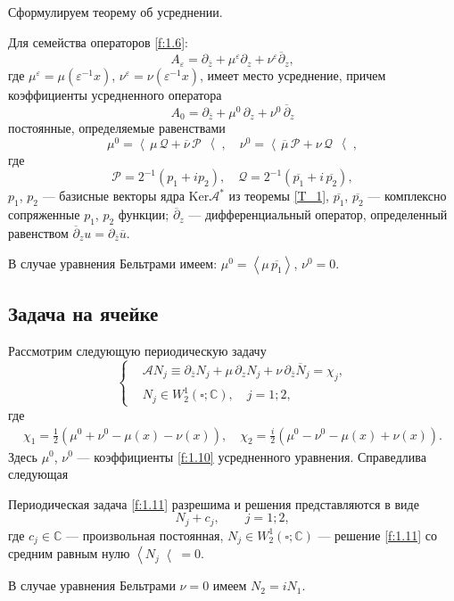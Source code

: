 Сформулируем теорему об усреднении.
\begin{theorem}[(Об усреднении)]\label{T_2}
Для семейства операторов \eqref{f:1.6}:
\begin{equation*}
   A_\varepsilon=\partial_{\bar{z}}+\mu^\varepsilon\partial_z+\nu^\varepsilon\overline
   \partial_{z},
\end{equation*}
где $\mu^\varepsilon=\mu(\varepsilon^{-1}x)$, $\nu^\varepsilon=\nu(\varepsilon^{-1}x)$,
имеет место усреднение, причем коэффициенты усредненного оператора
$$
A_0=\partial_{\bar{z}}+\mu^0\,\partial_z +\nu^0\,\overline{\partial}_{z}
$$
постоянные, определяемые  равенствами
\begin{equation}\label{f:1.10}
\mu^0=\left<\,\mu\, \mathscr Q+\overline{\nu}\,\mathscr{P}\,\right<, \quad
\nu^0=\left<\,\overline{\mu}\,\mathscr{P}+\nu\, \mathscr Q\,\right<,
\end{equation}
где
$$
\mathscr{P}=2^{-1}(p_1+ip_2),
\quad \mathscr Q=2^{-1}(\overline{p_1}+i\,\overline{p_2}),
$$
$p_1$, $p_2$ ---  базисные векторы ядра $\mathrm{Ker}\mathscr{A}^\ast$ из теоремы \ref{T_1}, $\overline{p_1}$, $\overline{p_2}$ --- комплексно сопряженные $p_1$, $p_2$ функции;  $\overline\partial_{z}$ --- дифференциальный оператор, определенный равенством
$\overline\partial_{z} u=\partial_{\bar z}\overline{u}$.

В случае уравнения Бельтрами имеем: $\mu^0=\left<\mu\,\overline{p_1}\right>$,
$\nu^0=0$.
\end{theorem}

\subsection{Задача на ячейке}

Рассмотрим следующую периодическую задачу
\begin{equation}\label{f:1.11}
\left\{\begin{aligned}
&\mathscr{A}N_j\equiv \partial_{\bar z}N_j+\mu\,\partial_z N_j+\nu\,
\partial_{\bar z}\overline{N}_j=\chi_j,\\
& N_j\in W_2^{1}(\square;\mathbb{C}),\quad j=1;2,
\end{aligned}\right.
\end{equation}
где
\begin{equation}\label{f:1.12}
\begin{aligned}
\chi_1=\frac12\left(\mu^0+\nu^0-\mu(x)-\nu(x)\right),\quad
\chi_2=\frac{i}2\left(\mu^0-\nu^0-\mu(x)+\nu(x)\right).
\end{aligned}
\end{equation}
Здесь $\mu^0$, $\nu^0$ --- коэффициенты \eqref{f:1.10} усредненного уравнения.
Справедлива следующая
\begin{theorem}[(см.\,\cite{2})]\label{T_3}
Периодическая задача \eqref{f:1.11} разрешима и решения представляются в виде
\begin{equation*}
N_j+c_j,\quad \quad j=1;2,
\end{equation*}
где $c_j\in\mathbb{C}$ --- произвольная постоянная,
$N_j\in W_2^1(\square;
\mathbb{C})$ --- решение \eqref{f:1.11} со средним равным нулю $\left<N_j\right<=0$.

В случае уравнения Бельтрами $\nu=0$ имеем
$N_2=iN_1$.
\end{theorem}

